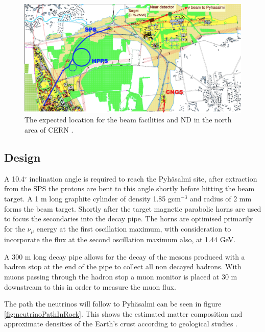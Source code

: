 \begin{figure}[htbp]
\begin{center}
\includegraphics[width=140mm]{Chapter2/figures/beamPlacement.png}
\caption{The expected location for the beam facilities and ND in the north area of CERN \cite{lbnoInternal}.}
\label{fig:beamLocation}
\end{center}
\end{figure}

\subsection{Design}
A 10.4$^{\circ}$ inclination angle is required to reach the Pyh\"asalmi site, after extraction from the SPS the protons are bent to this angle shortly before hitting the beam target. A 1 m long graphite cylinder of density 1.85 gcm$^{-3}$ and radius of 2 mm forms the beam target. Shortly after the target magnetic parabolic horns are used to focus the secondaries into the decay pipe. The horns are optimised primarily for the $\nu_{\mu}$ energy at the first oscillation maximum, with consideration to incorporate the flux at the second oscillation maximum also, at 1.44 GeV. 

A 300 m long decay pipe allows for the decay of the mesons produced with a hadron stop at the end of the pipe to collect all non decayed hadrons. With muons passing through the hadron stop a muon monitor is placed at 30 m downstream to this in order to measure the muon flux.

The path the neutrinos will follow to Pyh\"asalmi can be seen in figure \ref{fig:neutrinoPathInRock}. This shows the estimated matter composition and approximate densities of the Earth's crust according to geological studies \cite{neutrinoPathInRock}.


